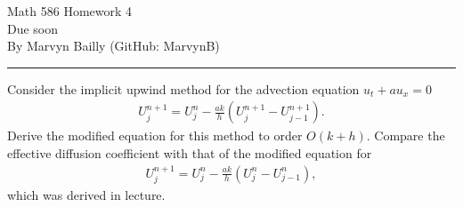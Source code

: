 \documentclass[12pt]{report}
\begin{document}
\large

\begin{center}
 Math 586 Homework 4\\
 Due soon\\
 By Marvyn Bailly (GitHub: MarvynB)\\
\end{center}

\normalsize

\hrule



\begin{problem}
    Consider the implicit upwind method for the advection equation $u_t + a u_x = 0$
  \begin{align*}
    U_{j}^{n+1} = U_{j}^n  - \frac{ak}{h} \left( U_j^{n+1} - U_{j-1}^{n+1} \right).
  \end{align*}
  Derive the modified equation for this method to order $O(k + h)$.  Compare the effective diffusion coefficient with that of the modified equation for
  \begin{align*}
    U_{j}^{n+1} = U_{j}^n  - \frac{ak}{h} \left( U_j^{n} - U_{j-1}^{n} \right),
  \end{align*}
  which was derived in lecture.
\end{problem}
\end{document}
